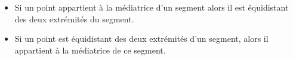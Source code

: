 \par\noindent\begin{itemize}
    \item Si un point appartient à la médiatrice d'un segment alors il est
    équidistant des deux extrémités du segment.
    \item Si un point est équidistant des deux extrémités d'un segment, alors
    il appartient à la médiatrice de ce segment.
\end{itemize}